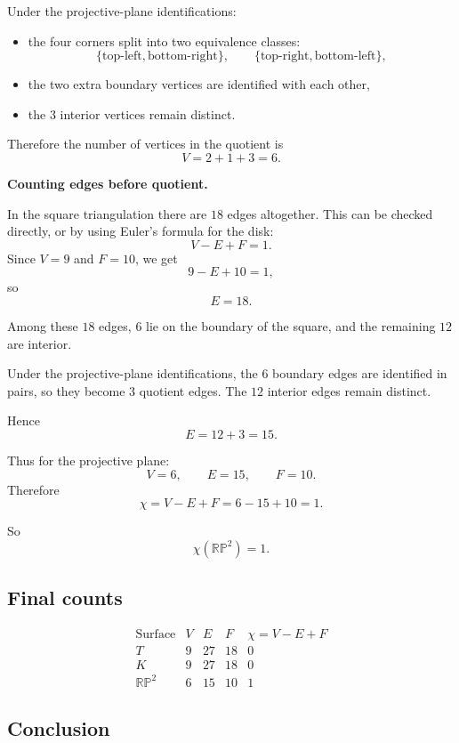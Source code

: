\documentclass[12pt,a4paper]{article}
\theoremstyle{notespace}
\begin{document}
Under the projective-plane identifications:
\begin{itemize}
	\item the four corners split into two equivalence classes:
	\[
	\{\text{top-left},\text{bottom-right}\},\qquad
	\{\text{top-right},\text{bottom-left}\},
	\]
	\item the two extra boundary vertices are identified with each other,
	\item the \(3\) interior vertices remain distinct.
\end{itemize}

Therefore the number of vertices in the quotient is
\[
V = 2 + 1 + 3 = 6.
\]

\medskip

\textbf{Counting edges before quotient.}

In the square triangulation there are \(18\) edges altogether. This can be checked directly, or by using Euler's formula for the disk:
\[
V-E+F=1.
\]
Since \(V=9\) and \(F=10\), we get
\[
9-E+10=1,
\]
so
\[
E=18.
\]

Among these \(18\) edges, \(6\) lie on the boundary of the square, and the remaining \(12\) are interior.

Under the projective-plane identifications, the \(6\) boundary edges are identified in pairs, so they become \(3\) quotient edges. The \(12\) interior edges remain distinct.

Hence
\[
E = 12+3=15.
\]

Thus for the projective plane:
\[
V=6,\qquad E=15,\qquad F=10.
\]
Therefore
\[
\chi = V-E+F = 6-15+10 = 1.
\]

So
\[
\boxed{\chi(\mathbb{RP}^2)=1}.
\]

\subsection{Final counts}

\[
\begin{array}{c|c|c|c|c}
	\text{Surface} & V & E & F & \chi=V-E+F\\
	\hline
	T & 9 & 27 & 18 & 0\\
	K & 9 & 27 & 18 & 0\\
	\mathbb{RP}^2 & 6 & 15 & 10 & 1
\end{array}
\]

\subsection{Conclusion}
\end{document}
